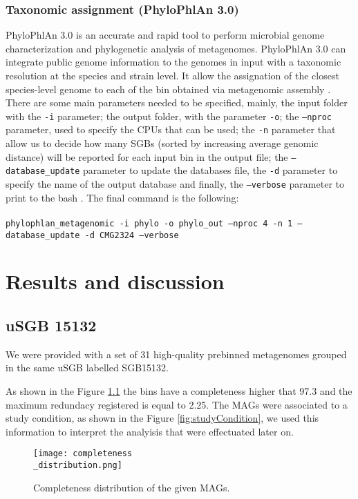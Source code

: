 \documentclass[a4paper,titlepage, oneside]{book}
\newcommand{\code}[1]{\colorbox{light-gray}{\texttt{#1}}}
\begin{document}
\subsection{Taxonomic assignment (PhyloPhlAn 3.0)}

PhyloPhlAn 3.0 is an accurate and rapid tool to perform microbial genome characterization and phylogenetic analysis of metagenomes. PhyloPhlAn 3.0 can integrate public genome information to the genomes in input with a taxonomic resolution at the species and strain level. It allow the assignation of the closest species-level genome to each of the bin obtained via metagenomic assembly \cite{Phylo}.
There are some main parameters needed to be specified, mainly, the input folder with the \code{-i} parameter; the output folder, with the parameter \code{-o}; the \code{--nproc} parameter, used to specify the CPUs that can be used; the \code{-n} parameter that allow us to decide  how many SGBs (sorted by increasing average genomic distance) will be reported for each input bin in the output file; the \code{--database\_update} parameter to update the databases file, the \code{-d} parameter to specify the name of the output database and finally, the \code{--verbose} parameter to print to the bash \cite{PhyloGuide}.
The final command is the following:\\ \newline \\ \code{phylophlan\_metagenomic -i phylo -o phylo\_out --nproc 4 -n 1 --database\_update -d CMG2324 --verbose}

\chapter{Results and discussion}

\section{uSGB 15132}

We were provided with a set of 31 high-quality prebinned metagenomes grouped in the same uSGB labelled SGB15132.

As shown in the Figure \ref{fig:compl} the bins have a completeness higher that 97.3 and the maximum redundacy registered is equal to 2.25.
The MAGs were associated to a study condition, as shown in the Figure \ref{fig:studyCondition}, we used this information to interpret the analyisis that were effectuated later on.

\begin{figure}[ht]
\centering
\texttt{[image: completeness\\\_distribution.png]}
\caption{Completeness distribution of the given MAGs.}
\label{fig:compl}
\end{figure}
\end{document}
